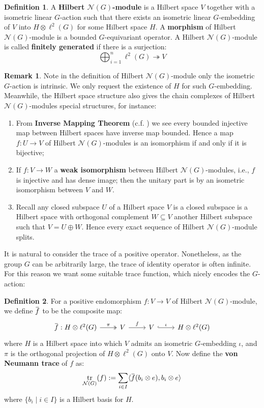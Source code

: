 \documentclass[11pt]{report}
\theoremstyle{definition}
\newtheorem{Def}{Definition}[chapter]
\newtheorem{Rmk}{Remark}[chapter]
\theoremstyle{plain}
\DeclareMathOperator{\tr}{tr}
\newcommand{\vna}{\mathcal{N}}
\newcommand{\overbar}[1]{\mkern 1.5mu\overline{\mkern-1.5mu#1\mkern-1.5mu}\mkern 1.5mu}
\newcommand{\brac}[1]{\langle #1 \rangle}
\renewcommand{\bar}{\overbar}
\begin{document}
\begin{Def}
	A \textbf{Hilbert $\vna(G)$-module} is a Hilbert space $V$ together with a isometric linear $G$-action such that there exists an isometric linear $G$-embedding of $V$ into $H\otimes \ell^2(G)$ for some Hilbert space $H$. A \textbf{morphism} of Hilbert $\vna(G)$-module is a bounded $G$-equivariant operator. A Hilbert $\vna(G)$-module is called \textbf{finitely generated} if there is a surjection: 
	\begin{equation*}
	\bigoplus_{i=1}^n \ell^2(G)\twoheadrightarrow V
	\end{equation*}
\end{Def}
\begin{Rmk}\label{1.6}
	Note in the definition of Hilbert $\vna(G)$-module only the isometric $G$-action is intrinsic. We only request the existence of $H$ for such $G$-embedding. Meanwhile, the Hilbert space structure also gives the chain complexes of Hilbert $\vna(G)$-modules special structures, for instance:
	\begin{enumerate}
		\item From \textbf{Inverse Mapping Theorem} (c.f. \cite[Chapter~III, Theorem 12.5]{conway2013}) we see every bounded injective map between Hilbert spaces have inverse map bounded. Hence a map $f:U\to V$ of Hilbert $\vna(G)$-modules is an isomorphism if and only if it is bijective;
		\item If $f:V\to W$ a \textbf{weak isomorphism} between Hilbert $\vna(G)$-modules, i.e., $f$ is injective and has dense image; then the unitary part is by  an isometric isomorphism  between $V$ and $W$. 
		\item Recall any closed subspace $U$ of a Hilbert space $V$ is a closed subspace is a Hilbert space with orthogonal complement $W\subseteq V$ another Hilbert subspace such that $V=U\oplus W$. Hence every exact sequence of Hilbert $\vna(G)$-module splits. 
	\end{enumerate}
\end{Rmk}
It is natural to consider the trace of a positive operator. Nonetheless, as the group $G$ can be arbitrarily large, the trace of identity operator is often infinite. For this reason we want some suitable trace function, which nicely encodes the $G$-action:
\begin{Def}\label{1.8}
	For a positive endomorphism $f:V\to V$ of Hilbert $\vna(G)$-module, we define $\bar{f}$ to be the composite map:
\begin{equation}
\begin{tikzcd}
\bar{f}:H\otimes\ell^2(G)\rar[two heads]{\pi}  & V \rar{f} &V \rar[hook]{\iota} &H\otimes \ell^2(G)
\end{tikzcd}
\end{equation}
where $H$ is a Hilbert space into which $V$ admits an isometric $G$-embedding $\iota$,  and $\pi$ is the orthogonal projection of $H\otimes \ell^2(G)$ onto $V$. Now define the \textbf{von Neumann trace} of $f$ as:
\begin{equation}
\tr_{\vna(G)}(f):=\sum_{i\in I}\brac{\bar{f}(b_i\otimes e), b_i\otimes e}
\end{equation}
where $\{b_i\mid i\in I\}$ is a Hilbert basis for $H$. 
\end{Def}
\end{document}
